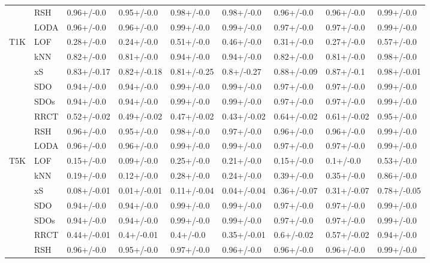 \begin{table}
\begin{tabular}{lllllllll}
      & RSH &   0.96+/-0.0 &   0.95+/-0.0 &   0.98+/-0.0 &   0.98+/-0.0 &   0.96+/-0.0 &   0.96+/-0.0 &   0.99+/-0.0 \\
      & LODA &   0.96+/-0.0 &   0.96+/-0.0 &   0.99+/-0.0 &   0.99+/-0.0 &   0.97+/-0.0 &   0.97+/-0.0 &   0.99+/-0.0 \\
T1K & LOF &   0.28+/-0.0 &   0.24+/-0.0 &   0.51+/-0.0 &   0.46+/-0.0 &   0.31+/-0.0 &   0.27+/-0.0 &   0.57+/-0.0 \\
      & kNN &   0.82+/-0.0 &   0.81+/-0.0 &   0.94+/-0.0 &   0.94+/-0.0 &   0.82+/-0.0 &   0.81+/-0.0 &   0.98+/-0.0 \\
      & xS &  0.83+/-0.17 &  0.82+/-0.18 &  0.81+/-0.25 &   0.8+/-0.27 &  0.88+/-0.09 &   0.87+/-0.1 &  0.98+/-0.01 \\
      & SDO &   0.94+/-0.0 &   0.94+/-0.0 &   0.99+/-0.0 &   0.99+/-0.0 &   0.97+/-0.0 &   0.97+/-0.0 &   0.99+/-0.0 \\
      & SDOs &   0.94+/-0.0 &   0.94+/-0.0 &   0.99+/-0.0 &   0.99+/-0.0 &   0.97+/-0.0 &   0.97+/-0.0 &   0.99+/-0.0 \\
      & RRCT &  0.52+/-0.02 &  0.49+/-0.02 &  0.47+/-0.02 &  0.43+/-0.02 &  0.64+/-0.02 &  0.61+/-0.02 &   0.95+/-0.0 \\
      & RSH &   0.96+/-0.0 &   0.95+/-0.0 &   0.98+/-0.0 &   0.97+/-0.0 &   0.96+/-0.0 &   0.96+/-0.0 &   0.99+/-0.0 \\
      & LODA &   0.96+/-0.0 &   0.96+/-0.0 &   0.99+/-0.0 &   0.99+/-0.0 &   0.97+/-0.0 &   0.97+/-0.0 &   0.99+/-0.0 \\
T5K & LOF &   0.15+/-0.0 &   0.09+/-0.0 &   0.25+/-0.0 &   0.21+/-0.0 &   0.15+/-0.0 &    0.1+/-0.0 &   0.53+/-0.0 \\
      & kNN &   0.19+/-0.0 &   0.12+/-0.0 &   0.28+/-0.0 &   0.24+/-0.0 &   0.39+/-0.0 &   0.35+/-0.0 &   0.86+/-0.0 \\
      & xS &  0.08+/-0.01 &  0.01+/-0.01 &  0.11+/-0.04 &  0.04+/-0.04 &  0.36+/-0.07 &  0.31+/-0.07 &  0.78+/-0.05 \\
      & SDO &   0.94+/-0.0 &   0.94+/-0.0 &   0.99+/-0.0 &   0.99+/-0.0 &   0.97+/-0.0 &   0.97+/-0.0 &   0.99+/-0.0 \\
      & SDOs &   0.94+/-0.0 &   0.94+/-0.0 &   0.99+/-0.0 &   0.99+/-0.0 &   0.97+/-0.0 &   0.97+/-0.0 &   0.99+/-0.0 \\
      & RRCT &  0.44+/-0.01 &   0.4+/-0.01 &    0.4+/-0.0 &  0.35+/-0.01 &   0.6+/-0.02 &  0.57+/-0.02 &   0.94+/-0.0 \\
      & RSH &   0.96+/-0.0 &   0.95+/-0.0 &   0.97+/-0.0 &   0.96+/-0.0 &   0.96+/-0.0 &   0.96+/-0.0 &   0.99+/-0.0 \\

\end{tabular}
\end{table}
